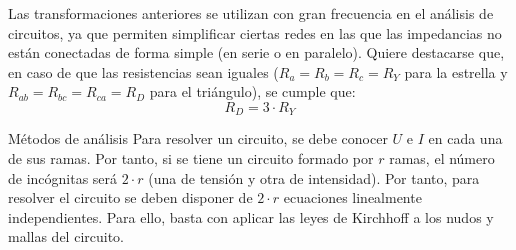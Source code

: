 \documentclass[11pt]{book} %
\makeatletter
\numberwithin{dummy}{section}
\theoremstyle{ocrenumbox}
\theoremstyle{blacknumex}
\theoremstyle{blacknumbox}
\theoremstyle{ocrenum}
\renewcommand{\section}{\@startsection{section}{1}{\z@}
{-4ex \@plus -1ex \@minus -.4ex}
{1ex \@plus.2ex }
{\normalfont\large\sffamily\bfseries}}
\makeatother
\begin{document}
	Las transformaciones anteriores se utilizan con gran frecuencia en el análisis de circuitos, ya que permiten simplificar ciertas redes en las que las impedancias no están
	conectadas de forma simple (en serie o en paralelo). Quiere destacarse que, en caso de que las resistencias sean iguales ($R_a=R_b=R_c=R_Y$ para la estrella y $R_{ab}=R_{bc}=R_{ca}=R_D$ para el triángulo), se cumple que: 
	\begin{equation}
		\boxed{R_D=3\cdot R_Y}
	\end{equation}
	
	\section{Métodos de análisis}
	Para resolver un circuito, se debe conocer $U$ e $I$ en cada una de sus ramas. Por tanto, si se tiene un circuito formado por $r$ ramas, el número de incógnitas será $2\cdot r$ (una de tensión y otra de intensidad). Por tanto, para resolver el circuito se deben disponer de $2\cdot r$ ecuaciones linealmente independientes. Para ello, basta con aplicar las leyes de Kirchhoff a los nudos y mallas del circuito. 
	
\end{document}

